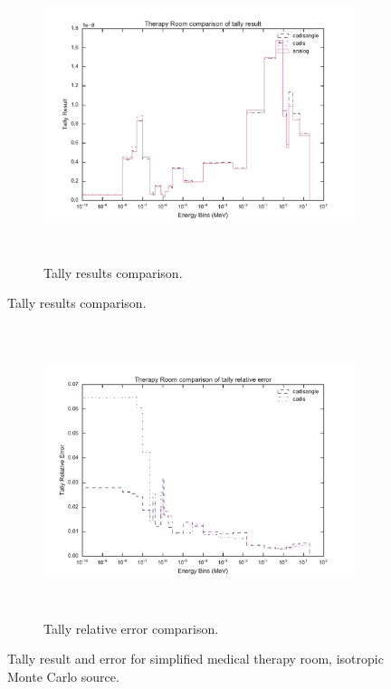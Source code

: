 \begin{figure}[htb!]
  \centering
  \begin{subfigure}[t]{\textwidth}
    \centering
    \includegraphics[height=8.5cm]{./chapters/characterization_probs/figures/char/therapy_iso/therapy_room_tally_result_compare.pdf}
    \caption[Tally results comparison.]
    {Tally results comparison.}
    \label{fig:isotherapyresult}
  \end{subfigure}
\end{figure}
\begin{figure}[htb!]\ContinuedFloat
  \centering
  \begin{subfigure}[t]{\textwidth}
    \centering
    \includegraphics[height=8.5cm]{./chapters/characterization_probs/figures/char/therapy_iso/therapy_room_tally_error_compare.pdf}
    \caption[Tally relative error comparison.]
    {Tally relative error comparison.}
    \label{fig:isotherapyerror}
  \end{subfigure}
\caption[Tally result and error for simplified medical therapy room,
  isotropic Monte Carlo source]
  {Tally result and error for simplified medical therapy room, isotropic
  Monte Carlo source.}
\label{fig:isotherapyresults}
\end{figure}

